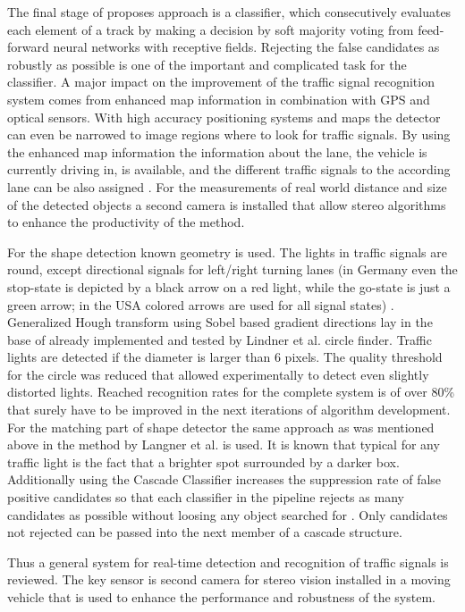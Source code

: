 \documentclass[letterpaper, 10 pt, conference]{ieeeconf} %
\begin{document}
The final stage of proposes approach is a classifier, which consecutively evaluates each element of a track by making a decision by soft majority voting from feed-forward neural networks with receptive fields. Rejecting the false candidates as robustly as possible is one of the important and complicated task for the classifier. A major impact on the improvement of the traffic signal recognition system comes from enhanced map information in combination with GPS and optical sensors. With high accuracy positioning systems and maps the detector can even be narrowed to image regions where to look for traffic signals. By using the enhanced map information the information about the lane, the vehicle is currently driving in, is available, and the different traffic signals to the according lane can be also assigned \cite{c6}. For the measurements of real world distance and size of the detected objects a second camera is installed that allow stereo algorithms to enhance the productivity of the method.

For the shape detection known geometry is used. The lights in traffic signals are round, except directional signals for left/right turning lanes (in Germany even the stop-state is depicted by a black arrow on a red light, while the go-state is just a green arrow; in the USA colored arrows are used for all signal states) \cite{c6}. Generalized Hough transform using Sobel based gradient directions lay in the base of already implemented and tested by Lindner et al. circle finder. Traffic lights are detected if the diameter is larger than 6 pixels. The quality threshold for the circle was reduced that allowed experimentally to detect even slightly distorted lights. Reached recognition rates for the complete system is of over 80\% that surely have to be improved in the next iterations of algorithm development. For the matching part of shape detector the same approach as was mentioned above in the method by Langner et al. is used. It is known that typical for any traffic light is the fact that a brighter spot surrounded by a darker box. Additionally using the Cascade Classifier increases the suppression rate of false positive candidates so that each classifier in the pipeline rejects as many candidates as possible without loosing any object searched for \cite{c6}. Only candidates not rejected can be passed into the next member of a cascade structure. 

Thus a general system for real-time detection and recognition of traffic signals is reviewed. The key sensor is second camera for stereo vision installed in a moving vehicle that is used to enhance the performance and robustness of the system. 
\end{document}

